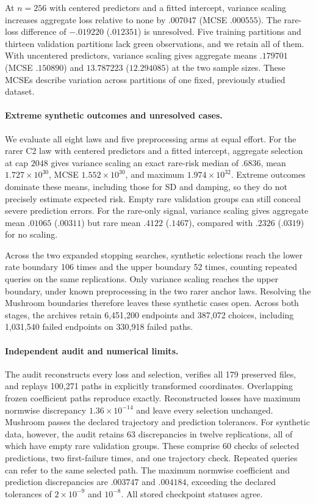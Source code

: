 At $n = 256$ with centered predictors and a fitted intercept, variance scaling
increases aggregate loss relative to none by $.007047$ (MCSE $.000555$). The
rare-loss difference of $-.019220$ ($.012351$) is unresolved. Five training
partitions and thirteen validation partitions lack green observations, and we
retain all of them. With uncentered predictors, variance scaling gives aggregate
means $.179701$ (MCSE $.150890$) and $13.787223$ ($12.294085$) at the two
sample sizes. These MCSEs describe variation across partitions of one fixed,
previously studied dataset.

\paragraph{Extreme synthetic outcomes and unresolved cases.}

We evaluate all eight laws and five preprocessing arms at equal effort. For the
rarer C2 law with centered predictors and a fitted intercept, aggregate
selection at cap $2048$ gives variance scaling an exact rare-risk median of
$.6836$, mean $1.727 \times 10^{30}$, MCSE $1.552 \times 10^{30}$, and
maximum $1.974 \times 10^{32}$. Extreme outcomes dominate these means,
including those for SD and damping, so they do not precisely estimate expected
risk. Empty rare validation groups can still conceal severe prediction errors.
For the rare-only signal, variance scaling gives aggregate mean $.01065$
($.00311$) but rare mean $.4122$ ($.1467$), compared with $.2326$ ($.0319$)
for no scaling.

Across the two expanded stopping searches, synthetic selections reach the lower
rate boundary 106 times and the upper boundary 52 times, counting repeated
queries on the same replications. Only variance scaling reaches the upper
boundary, under known preprocessing in the two rarer anchor laws. Resolving the
Mushroom boundaries therefore leaves these synthetic cases open. Across both
stages, the archives retain 6,451,200 endpoints and 387,072 choices, including
1,031,540 failed endpoints on 330,918 failed paths.

\paragraph{Independent audit and numerical limits.}

The audit reconstructs every loss and selection, verifies all 179 preserved
files, and replays 100,271 paths in explicitly transformed coordinates.
Overlapping frozen coefficient paths reproduce exactly. Reconstructed losses
have maximum normwise discrepancy $1.36 \times 10^{-14}$ and leave every
selection unchanged. Mushroom passes the declared trajectory and prediction
tolerances. For synthetic data, however, the audit retains 63 discrepancies in
twelve replications, all of which have empty rare validation groups. These
comprise 60 checks of selected predictions, two first-failure times, and one
trajectory check. Repeated queries can refer to the same selected path. The
maximum normwise coefficient and prediction discrepancies are $.003747$ and
$.004184$, exceeding the declared tolerances of $2 \times 10^{-9}$ and
$10^{-8}$. All stored checkpoint statuses agree.

